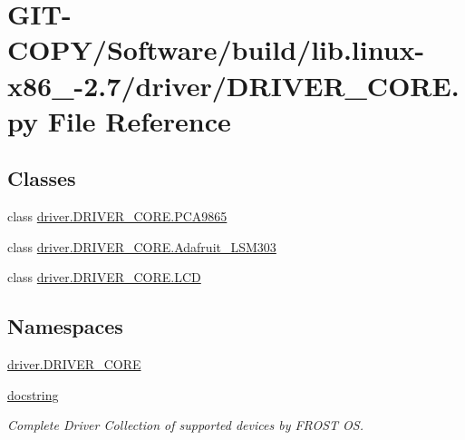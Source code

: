 \hypertarget{GIT-COPY_2Software_2build_2lib_8linux-x86__64-2_87_2driver_2DRIVER__CORE_8py}{}\section{G\+I\+T-\/\+C\+O\+P\+Y/\+Software/build/lib.linux-\/x86\+\_-\/2.7/driver/\+D\+R\+I\+V\+E\+R\+\_\+\+C\+O\+R\+E.py File Reference}
\label{GIT-COPY_2Software_2build_2lib_8linux-x86__64-2_87_2driver_2DRIVER__CORE_8py}
\subsection*{Classes}
\begin{DoxyCompactItemize}
\item 
class \hyperlink{classdriver_1_1DRIVER__CORE_1_1PCA9865}{driver.\+D\+R\+I\+V\+E\+R\+\_\+\+C\+O\+R\+E.\+P\+C\+A9865}
\item 
class \hyperlink{classdriver_1_1DRIVER__CORE_1_1Adafruit__LSM303}{driver.\+D\+R\+I\+V\+E\+R\+\_\+\+C\+O\+R\+E.\+Adafruit\+\_\+\+L\+S\+M303}
\item 
class \hyperlink{classdriver_1_1DRIVER__CORE_1_1LCD}{driver.\+D\+R\+I\+V\+E\+R\+\_\+\+C\+O\+R\+E.\+L\+C\+D}
\end{DoxyCompactItemize}
\subsection*{Namespaces}
\begin{DoxyCompactItemize}
\item 
 \hyperlink{namespacedriver_1_1DRIVER__CORE}{driver.\+D\+R\+I\+V\+E\+R\+\_\+\+C\+O\+R\+E}
\item 
 \hyperlink{namespacedocstring}{docstring}
\begin{DoxyCompactList}\small\item\em Complete Driver Collection of supported devices by F\+R\+O\+S\+T O\+S. \end{DoxyCompactList}\end{DoxyCompactItemize}
